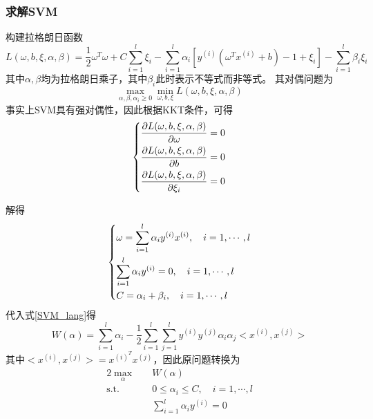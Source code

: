 \documentclass[supercite]{upcthesis}
\begin{document}
\subsubsection{求解SVM}
构建拉格朗日函数
\begin{equation}
L(\omega,b,\xi,\alpha,\beta)=\frac{1}{2}\omega^T\omega+C\sum_{i=1}^{l}\xi_i-\sum_{i=1}^{l}\alpha_{i}[y^{(i)}(\omega^Tx^{(i)}+b)-1+\xi_i]-\sum_{i=1}^{l}\beta_{i}\xi_i
\label{SVM_lang}
\end{equation}
其中$\alpha,\beta$均为拉格朗日乘子，其中$\beta_{i}$此时表示不等式而非等式。
其对偶问题为
\begin{equation}
\max\limits_{\alpha,\beta,\alpha_{i} \geq 0} \min\limits_{\omega,b,\xi}L(\omega,b,\xi,\alpha,\beta)
\end{equation}
事实上SVM具有强对偶性，因此根据KKT条件，可得
\begin{equation}
\begin{dcases}
\frac{\partial L(\omega,b,\xi,\alpha,\beta)}{\partial \omega}=0\\
\frac{\partial L(\omega,b,\xi,\alpha,\beta)}{\partial b}=0\\
\frac{\partial L(\omega,b,\xi,\alpha,\beta)}{\partial \xi_i}=0\\
\end{dcases}
\end{equation}

解得
\begin{equation}
\begin{dcases}
\omega=\sum_{i=1}^{l} \alpha_{i}y^{(i)}x^{(i)},\quad i=1,\cdots,l\\
\sum_{i=1}^{l} \alpha_{i}y^{(i)}=0,\quad i=1,\cdots,l\\
C=\alpha_{i}+\beta_{i},\quad i=1,\cdots,l\\
\end{dcases}
\end{equation}
代入式\ref{SVM_lang}得
\begin{equation}
W(\alpha)=\sum_{i=1}^{l}\alpha_{i}-\frac{1}{2}\sum_{i=1}^{l}\sum_{j=1}^{l}y^{(i)}y^{(j)}\alpha_{i}\alpha_{j}<x^{(i)},x^{(j)}>
\end{equation}
其中$<x^{(i)},x^{(j)}>=x^{(i)^T}x^{(j)}$，因此原问题转换为
\begin{alignat}{2}
\max\limits_\alpha \quad &W(\alpha)\\
\text{s.t.} \quad & 0 \leq \alpha_{i} \leq C,\quad i=1,\cdots,l\nonumber\\
&\sum_{i=1}^{l} \alpha_{i}y^{(i)}=0\nonumber
\end{alignat}
\end{document}
